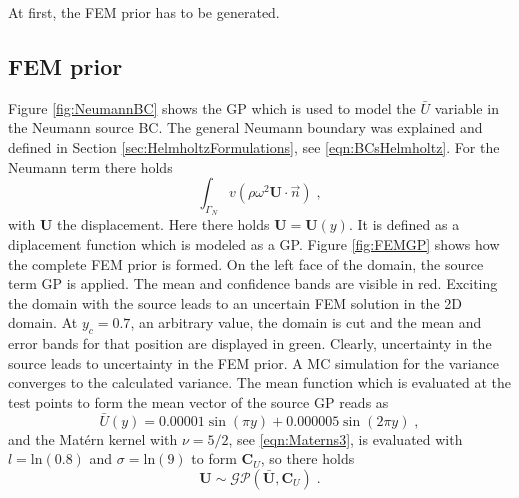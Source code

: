 \documentclass[%
  a4paper,oneside,%
  11pt,%
  smallchapters,
  style=printdev,
  extramargin,
  green,%
  rgb, <cmyk>
  ]{tubsbook}
\begin{document}
At first, the FEM prior has to be generated.

\subsection{FEM prior}
\label{sec:2DFEMprior}
Figure \ref{fig:NeumannBC} shows the GP which is used to model the $\bar{U}$ variable in the Neumann source BC. The general Neumann boundary was explained and defined in Section \ref{sec:HelmholtzFormulations}, see \eqref{eqn:BCsHelmholtz}. For the Neumann term there holds
\begin{equation}
\int_{\Gamma_N} v (\rho \omega^2 \bm{U} \cdot \vec{n}) \;,
\end{equation}
with $\bm{U}$ the displacement. Here there holds $\bm{U} = \bm{U}(y)$. It is defined as a diplacement function which is modeled as a GP.
Figure \ref{fig:FEMGP} shows how the complete FEM prior is formed. On the left face of the domain, the source term GP is applied. The mean and confidence bands are visible in red. Exciting the domain with the source leads to an uncertain FEM solution in the 2D domain. At $y_c = 0.7$, an arbitrary value, the domain is cut and the mean and error bands for that position are displayed in green. Clearly, uncertainty in the source leads to uncertainty in the FEM prior. A MC simulation for the variance converges to the calculated variance.
The mean function which is evaluated at the test points to form the mean vector of the source GP reads as
\begin{equation}
\bar{U}(y) = 0.00001 \sin(\pi y) + 0.000005 \sin(2\pi y) \;,
\end{equation}
and the Mat\'ern kernel with $\nu = 5/2$, see \eqref{eqn:Materns3}, is evaluated with $l = \mathrm{ln}(0.8)$ and $\sigma = \mathrm{ln}(9)$ to form $\bm{C}_U$, so there holds
\begin{equation}
\bm{U} \sim \mathcal{GP}(\bar{\bm{U}},\bm{C}_U) \;.
\end{equation}
\end{document}
